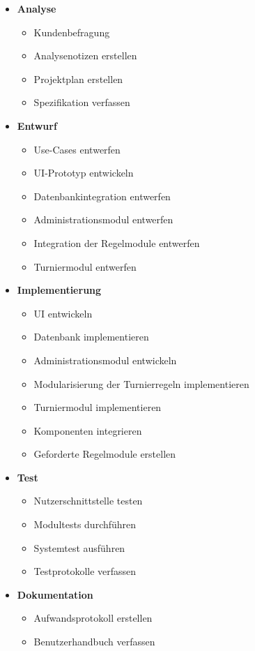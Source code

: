 \documentclass[11pt]{article}
\begin{document}
\begin{itemize}
	\item \textbf{Analyse}
	\begin{itemize}
		\item Kundenbefragung
		\item Analysenotizen erstellen
		\item Projektplan erstellen
		\item Spezifikation verfassen
	\end{itemize}
	\item \textbf{Entwurf}
	\begin{itemize}
		\item Use-Cases entwerfen
		\item UI-Prototyp entwickeln
		\item Datenbankintegration entwerfen
		\item Administrationsmodul entwerfen
		\item Integration der Regelmodule entwerfen
		\item Turniermodul entwerfen
	\end{itemize}
	\item \textbf{Implementierung}
	\begin{itemize}
		\item UI entwickeln
		\item Datenbank implementieren
		\item Administrationsmodul entwickeln
		\item Modularisierung der Turnierregeln implementieren
		\item Turniermodul implementieren
		\item Komponenten integrieren
		\item Geforderte Regelmodule erstellen
	\end{itemize}
	\item \textbf{Test}
	\begin{itemize}
		\item Nutzerschnittstelle testen
		\item Modultests durchführen
		\item Systemtest ausführen
		\item Testprotokolle verfassen
	\end{itemize}
	\item \textbf{Dokumentation}
	\begin{itemize}
		\item Aufwandsprotokoll erstellen
		\item Benutzerhandbuch verfassen
	\end{itemize}
\end{itemize}
\end{document}
